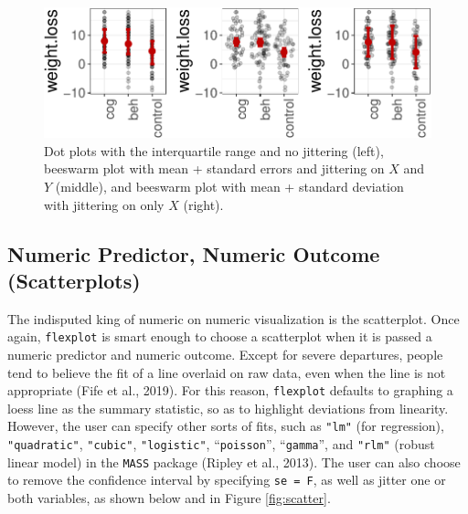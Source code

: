 \documentclass[
  man]{apa6}
\begin{document}
\begin{figure}

{\centering \includegraphics[width=0.9\linewidth]{flexplot_psychmeth_files/figure-latex/jitterit-1} 

}

\caption{Dot plots with the interquartile range and no jittering (left), beeswarm plot with mean + standard errors and jittering on $X$ and $Y$ (middle), and beeswarm plot with mean + standard deviation with jittering on only $X$ (right).}\label{fig:jitterit}
\end{figure}

\normalsize

\hypertarget{numeric-predictor-numeric-outcome-scatterplots}{%
\subsection{Numeric Predictor, Numeric Outcome (Scatterplots)}\label{numeric-predictor-numeric-outcome-scatterplots}}

The indisputed king of numeric on numeric visualization is the scatterplot. Once again, \texttt{flexplot} is smart enough to choose a scatterplot when it is passed a numeric predictor and numeric outcome. Except for severe departures, people tend to believe the fit of a line overlaid on raw data, even when the line is not appropriate (Fife et al., 2019). For this reason, \texttt{flexplot} defaults to graphing a loess line as the summary statistic, so as to highlight deviations from linearity. However, the user can specify other sorts of fits, such as \texttt{"lm"} (for regression), \texttt{"quadratic"}, \texttt{"cubic"}, \texttt{"logistic"}, ``\texttt{poisson}'', ``\texttt{gamma}'', and \texttt{"rlm"} (robust linear model) in the \texttt{MASS} package (Ripley et al., 2013). The user can also choose to remove the confidence interval by specifying \texttt{se\ =\ F}, as well as jitter one or both variables, as shown below and in Figure \ref{fig:scatter}.

\small
\end{document}
